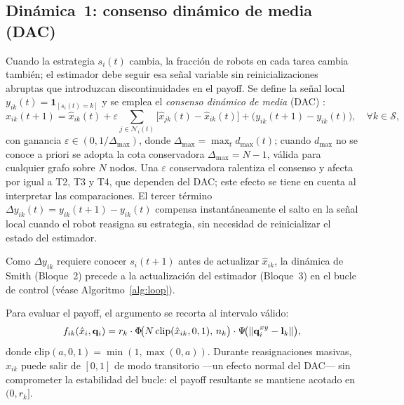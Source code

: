 

\subsection{Dinámica~1: consenso dinámico de media (DAC)}

Cuando la estrategia $s_i(t)$ cambia, la fracción de robots en cada tarea cambia
también; el estimador debe seguir esa señal variable sin reinicializaciones
abruptas que introduzcan discontinuidades en el payoff.
Se define la señal local $y_{ik}(t) = \mathbf{1}_{[s_i(t)=k]}$ y se emplea el
\emph{consenso dinámico de media} (DAC) \citep{kia2019tutorial}:
\begin{equation}
  \hat{x}_{ik}(t+1) = \hat{x}_{ik}(t)
    + \varepsilon \!\sum_{j \in \mathcal{N}_i(t)}\!\bigl[\hat{x}_{jk}(t) - \hat{x}_{ik}(t)\bigr]
    + \bigl(y_{ik}(t+1) - y_{ik}(t)\bigr),
  \quad \forall k \in \mathcal{S},
  \label{eq:consenso}
\end{equation}
con ganancia $\varepsilon \in (0, 1/\Delta_{\max})$, donde
$\Delta_{\max} = \max_t d_{\max}(t)$; cuando $d_{\max}$ no se conoce a priori se
adopta la cota conservadora $\Delta_{\max} = N-1$, válida para cualquier grafo sobre
$N$ nodos. Una $\varepsilon$ conservadora ralentiza el consenso y afecta por igual a
T2, T3 y T4, que dependen del DAC; este efecto se tiene en cuenta al interpretar las
comparaciones. El tercer término
$\Delta y_{ik}(t) = y_{ik}(t+1) - y_{ik}(t)$ compensa instantáneamente el salto
en la señal local cuando el robot reasigna su estrategia, sin necesidad de
reinicializar el estado del estimador.

Como $\Delta y_{ik}$ requiere conocer $s_i(t+1)$ antes de actualizar
$\hat{x}_{ik}$, la dinámica de Smith (Bloque~2) precede a la actualización
del estimador (Bloque~3) en el bucle de control (véase Algoritmo~\ref{alg:loop}).

Para evaluar el payoff, el argumento se recorta al intervalo válido:
\begin{equation}
  f_{ik}(\hat{x}_i, \mathbf{q}_i)
    = r_k \cdot \Phi\!\bigl(N\,\mathrm{clip}(\hat{x}_{ik},0,1),\,n_k\bigr)
      \cdot \Psi\!\bigl(\left\|\mathbf{q}_i^{xy} - \mathbf{l}_k\right\|\bigr),
  \label{eq:payoff_clip}
\end{equation}
donde $\mathrm{clip}(a,0,1) = \min(1,\max(0,a))$.
Durante reasignaciones masivas, $\hat{x}_{ik}$ puede salir de $[0,1]$ de modo
transitorio —un efecto normal del DAC— sin comprometer la estabilidad del bucle: el
payoff resultante se mantiene acotado en $(0, r_k]$.

